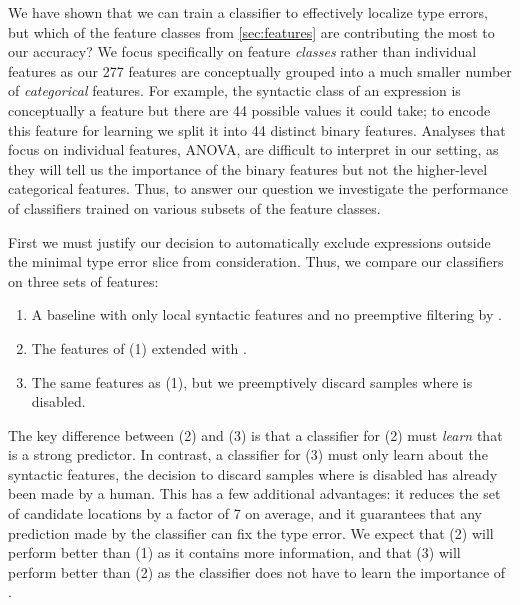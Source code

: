 \label{sec:feature-utility}
We have shown that we can train a classifier to effectively localize
type errors, but which of the feature classes from
\autoref{sec:features} are contributing the most to our accuracy?
%
We focus specifically on feature \emph{classes} rather than individual
features as our 277 features are conceptually grouped into a much
smaller number of \emph{categorical} features.
%
For example, the syntactic class of an expression is conceptually a
feature but there are 44 possible values it could take; to encode this
feature for learning we split it into 44 distinct binary features.
%
Analyses that focus on individual features, \eg \textsc{ANOVA},
are difficult to interpret in our setting, as they will tell us the
importance of the binary features but not the higher-level categorical
features.
%
Thus, to answer our question we investigate the performance of
classifiers trained on various subsets of the feature classes.

\label{sec:type-error-slice}
First we must justify our decision to automatically exclude expressions
outside the minimal type error slice from consideration.
%
%
Thus, we compare our classifiers on three sets of features:
%
\begin{enumerate}
\item A baseline with only local syntactic features and no
  preemptive filtering by \InSlice.
\item The features of (1) extended with \InSlice.
\item The same features as (1), but we preemptively discard samples
  where \InSlice is disabled.
\end{enumerate}
%
The key difference between (2) and (3) is that a classifier for (2) must
\emph{learn} that \InSlice is a strong predictor.
%
In contrast, a classifier for (3) must only learn about the syntactic
features, the decision to discard samples where \InSlice is disabled has
already been made by a human.
%
This has a few additional advantages: it reduces the set of candidate
locations by a factor of 7 on average, and it guarantees that any
prediction made by the classifier can fix the type error.
%
We expect that (2) will perform better than (1) as it contains more
information, and that (3) will perform better than (2) as the classifier
does not have to learn the importance of \InSlice.

